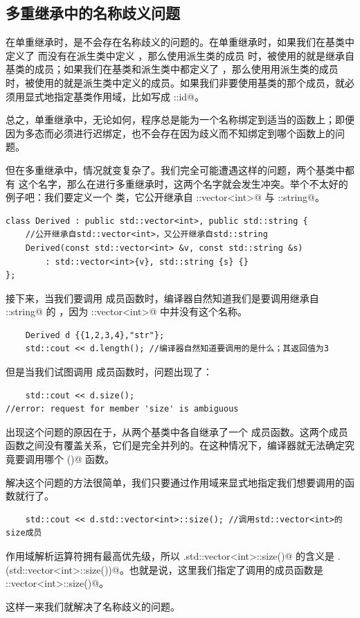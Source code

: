 \subsection*{多重继承中的名称歧义问题}
在单重继承时，是不会存在名称歧义的问题的。在单重继承时，如果我们在基类中定义了 \lstinline@id@ 而没有在派生类中定义 \lstinline@id@，那么使用派生类的成员 \lstinline@id@ 时，被使用的就是继承自基类的成员；如果我们在基类和派生类中都定义了 \lstinline@id@，那么使用用派生类的成员 \lstinline@id@ 时，被使用的就是派生类中定义的成员。如果我们非要使用基类的那个成员，就必须用显式地指定基类作用域，比如写成 \lstinline@Base::id@。\par
总之，单重继承中，无论如何，程序总是能为一个名称绑定到适当的函数上；即便因为多态而必须进行迟绑定，也不会存在因为歧义而不知绑定到哪个函数上的问题。\par
但在多重继承中，情况就变复杂了。我们完全可能遭遇这样的问题，两个基类中都有 \lstinline@id@ 这个名字，那么在进行多重继承时，这两个名字就会发生冲突。举个不太好的例子吧：我们要定义一个 \lstinline@Derived@ 类，它公开继承自 \lstinline@std::vector<int>@ 与 \lstinline@std::string@。
\begin{lstlisting}
class Derived : public std::vector<int>, public std::string {
    //公开继承自std::vector<int>，又公开继承自std::string
    Derived(const std::vector<int> &v, const std::string &s)
        : std::vector<int>{v}, std::string {s} {}
};
\end{lstlisting}
接下来，当我们要调用 \lstinline@length@ 成员函数时，编译器自然知道我们是要调用继承自 \lstinline@std::string@ 的 \lstinline@length@，因为 \lstinline@std::vector<int>@ 中并没有这个名称。
\begin{lstlisting}
    Derived d {{1,2,3,4},"str"};
    std::cout << d.length(); //编译器自然知道要调用的是什么；其返回值为3
\end{lstlisting}
但是当我们试图调用 \lstinline@size@ 成员函数时，问题出现了：
\begin{lstlisting}
    std::cout << d.size();
//error: request for member 'size' is ambiguous
\end{lstlisting}
出现这个问题的原因在于，\lstinline@Derived@ 从两个基类中各自继承了一个 \lstinline@size@ 成员函数。这两个成员函数之间没有覆盖关系，它们是完全并列的。在这种情况下，编译器就无法确定究竟要调用哪个 \lstinline@size()@ 函数。\par
解决这个问题的方法很简单，我们只要通过作用域来显式地指定我们想要调用的函数就行了。
\begin{lstlisting}
    std::cout << d.std::vector<int>::size(); //调用std::vector<int>的size成员
\end{lstlisting}
作用域解析运算符拥有最高优先级，所以 \lstinline@d.std::vector<int>::size()@ 的含义是 \lstinline@d.(std::vector<int>::size())@。也就是说，这里我们指定了调用的成员函数是 \lstinline@std::vector<int>::size()@。\par
这样一来我们就解决了名称歧义的问题。\par
